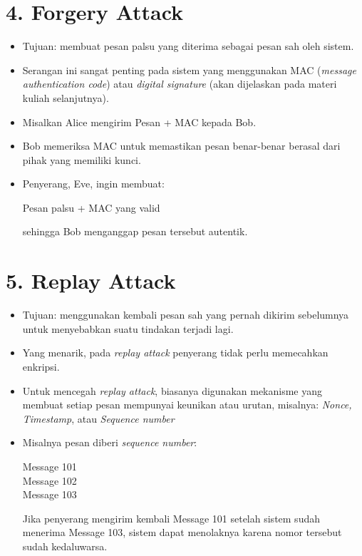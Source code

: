 \documentclass{article}
\begin{document}
\newpage


\section*{4. Forgery Attack}

\begin{itemize}
    \item Tujuan: membuat pesan palsu yang diterima sebagai pesan sah oleh sistem.
    \item Serangan ini sangat penting pada sistem yang menggunakan MAC (\textit{message authentication code}) atau \textit{digital signature} (akan dijelaskan pada materi kuliah selanjutnya).
    \item Misalkan Alice mengirim Pesan + MAC kepada Bob.
    \item Bob memeriksa MAC untuk memastikan pesan benar-benar berasal dari pihak yang memiliki kunci.
    \item Penyerang, Eve, ingin membuat:
    
    Pesan palsu + MAC yang valid
    
    sehingga Bob menganggap pesan tersebut autentik.
\end{itemize}

\newpage


\section*{5. Replay Attack}

\begin{itemize}
    \item Tujuan: menggunakan kembali pesan sah yang pernah dikirim sebelumnya untuk menyebabkan suatu tindakan terjadi lagi.
    \item Yang menarik, pada \textit{replay attack} penyerang tidak perlu memecahkan enkripsi.
    \item Untuk mencegah \textit{replay attack}, biasanya digunakan mekanisme yang membuat setiap pesan mempunyai keunikan atau urutan, misalnya: \textit{Nonce, Timestamp}, atau \textit{Sequence number}
    \item Misalnya pesan diberi \textit{sequence number}:
    
    Message 101 \\
    Message 102 \\
    Message 103
    
    Jika penyerang mengirim kembali Message 101 setelah sistem sudah menerima Message 103, sistem dapat menolaknya karena nomor tersebut sudah kedaluwarsa.
\end{itemize}
\end{document}
